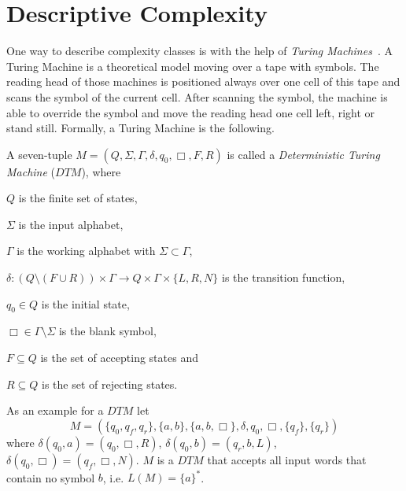 
\section{Descriptive Complexity}\label{sec:descriptiveComplexity}

One way to describe complexity classes is with the help of \textit{Turing Machines}~\cite{hopcroft1994einfuehrung}.
A Turing Machine is a theoretical model moving over a tape with symbols. The reading head of
those machines is positioned always over one cell of this tape and scans the symbol of the current cell. After scanning
the symbol, the machine is able to override the symbol and move the reading head one cell left, right or stand still.
Formally, a Turing Machine is the following.

\begin{definition}
    A seven-tuple $M = (Q, \Sigma, \Gamma, \delta, q_0, \Box, F, R)$ is called a \emph{Deterministic Turing Machine}
    ($\mathit{DTM}$), where
    \begin{compactitem}
        \item $Q$ is the finite set of states,
        \item $\Sigma$ is the input alphabet,
        \item $\Gamma$ is the working alphabet with $\Sigma \subset \Gamma$,
        \item $\delta : (Q \setminus (F \cup R)) \times \Gamma \rightarrow Q \times \Gamma \times \{L, R, N\}$ is the
        transition function,
        \item $q_0 \in Q$ is the initial state,
        \item $\Box \in \Gamma \setminus \Sigma$ is the blank symbol,
        \item $F \subseteq Q$ is the set of accepting states and
        \item $R \subseteq Q$ is the set of rejecting states.
    \end{compactitem}
\end{definition}

\begin{example}
    \label{example:dtm}
    As an example for a $\mathit{DTM}$ let
    \[M = (\{q_0, q_f, q_r\}, \{a, b\}, \{a, b, \Box\}, \delta, q_0, \Box, \{q_f\}, \{q_r\})\]
    where $\delta(q_0, a)= (q_0, \Box, R)$, $\delta(q_0, b) = (q_r, b, L)$, $\delta(q_0, \Box) = (q_f, \Box, N)$.
    $M$ is a $\mathit{DTM}$ that accepts all input words that contain no symbol $b$, i.e. $L(M) = \{a\}^*$.
\end{example}

